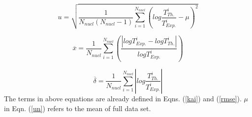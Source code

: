 \documentclass[preprint,10pt]{elsarticle}
\begin{document}
\begin{equation}
u =  \sqrt{\frac{1}{N_{nucl}(N_{nucl}-1)}\sum^{N_{nucl}}_{i=1}\left(log\frac{T^i_{Th.}}{T^i_{Exp.}}-\mu \right)^2}
\label{un}
\end{equation}

\begin{equation}
\overline{x} = \frac{1}{N_{nucl}}\sum^{N_{nucl}}_{i=1}\left(\frac{|logT^i_{Exp.}-logT^i_{Th.}|}{logT^i_{Exp.}}\right)
\end{equation}

\begin{equation}
\overline{\delta} = \frac{1}{N_{nucl}}\sum^{N_{nucl}}_{i=1}\left|log\frac{T^i_{Th.}}{T^i_{Exp.}}\right|
\end{equation}
The terms in above equations are already defined in Eqns. (\ref{kai}) and (\ref{rmse}). $\mu$ in Eqn. (\ref{un}) refers to the mean of full data set.
\end{document}
